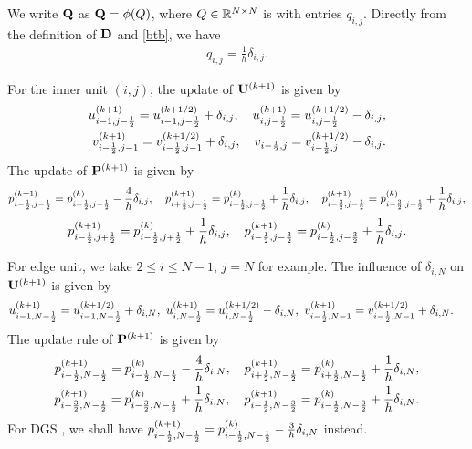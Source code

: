 \documentclass[english]{pkupaper}
\newenvironment{eqt}{\begin{equation}\begin{aligned}}{\end{aligned}\end{equation}}
\begin{document}
We write $\mathbf{Q}$ as $\mathbf{Q}=\phi(Q)$, where $Q\in \mathbb{R}^{N\times N}$ is with entries $q_{i,j}$. Directly from the definition of $\mathbf{D}$ and \ref{btb}, we have
\begin{eqt}
q_{i,j} = \frac{1}{h}\delta_{i,j}.
\end{eqt}

For the inner unit $(i,j)$, the update of  $\mathbf{U}^{(k+1)}$ is given by
\begin{eqt}
\label{uinner}
u_{i-1,j-\oot}^{(k+1)}=u_{i-1,j-\oot}^{(k+1/2)}+\delta_{i,j}, \quad u_{i,j-\oot}^{(k+1)}=u_{i,j-\oot}^{(k+1/2)}-\delta_{i,j},\\
v_{i-\oot,j-1}^{(k+1)}=v_{i-\oot,j-1}^{(k+1/2)}+\delta_{i,j}, \quad v_{i-\oot,j}=v_{i-\oot,j}^{(k+1/2)}-\delta_{i,j}.
\end{eqt}
The update of $\mathbf{P}^{(k+1)}$ is given by
\begin{eqt}
p_{i-\oot,j-\oot}^{(k+1)}=p_{i-\oot,j-\oot}^{(k)}-\frac{4}{h}\delta_{i,j}, \quad p_{i+\oot,j-\oot}^{(k+1)}=p_{i+\oot,j-\oot}^{(k)}+\frac{1}{h}\delta_{i,j}, \quad p_{i-\frac{3}{2},j-\oot}^{(k+1)}=p_{i-\frac{3}{2},j-\oot}^{(k)}+\frac{1}{h}\delta_{i,j},
\end{eqt}
\begin{eqt}
\label{pinner}
p_{i-\oot,j+\oot}^{(k+1)}=p_{i-\oot,j+\oot}^{(k)}+\frac{1}{h}\delta_{i,j}, \quad p_{i-\oot,j-\frac{3}{2}}^{(k+1)}=p_{i-\oot,j-\frac{3}{2}}^{(k)}+\frac{1}{h}\delta_{i,j}.
\end{eqt}

For edge unit, we take $2\leq i\leq N-1$, $j=N$ for example. The influence of $\delta_{i,N}$ on $\mathbf{U}^{(k+1)}$ is given by
\begin{eqt}
\label{uedge}
&u_{i-1,N-\oot}^{(k+1)}=u_{i-1,N-\oot}^{(k+1/2)}+\delta_{i,N}, \  u_{i,N-\oot}^{(k+1)}=u_{i,N-\oot}^{(k+1/2)}-\delta_{i,N}, \ v_{i-\oot,N-1}^{(k+1)}=v_{i-\oot,N-1}^{(k+1/2)}+\delta_{i,N}.
\end{eqt}
The update rule of $\mathbf{P}^{(k+1)}$ is given by
\begin{eqt}
p_{i-\oot,N-\oot}^{(k+1)}=p_{i-\oot,N-\oot}^{(k)}-\frac{4}{h}\delta_{i,N}, \quad p_{i+\oot,N-\oot}^{(k+1)}=p_{i+\oot,N-\oot}^{(k)}+\frac{1}{h}\delta_{i,N},\\
p_{i-\frac{3}{2},N-\oot}^{(k+1)}=p_{i-\frac{3}{2},N-\oot}^{(k)}+\frac{1}{h}\delta_{i,N}, \quad p_{i-\oot,N-\frac{3}{2}}^{(k+1)}=p_{i-\oot,N-\frac{3}{2}}^{(k)}+\frac{1}{h}\delta_{i,N}.
\end{eqt}
For DGS \cite{mmfts}, we shall have $p_{i-\frac{1}{2},N-\frac{1}{2}}^{(k+1)}=p_{i-\frac{1}{2},N-\frac{1}{2}}^{(k)}-\frac{3}{h}\delta_{i,N}$ instead.
\end{document}
